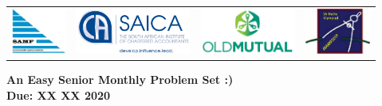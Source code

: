 \documentclass{article}
\begin{document}
\setlength{\tabcolsep}{5pt}
\begin{center} \begin{tabular}{cccc}
	\includegraphics[height=43pt]{SAMF_logo.jpg} &
	\includegraphics[height=43pt]{SAICA_logo.jpg} &
	\includegraphics[height=43pt]{OM_Logo_Stacked_Vignette_on_White_RGB.jpg} &
	\includegraphics[height=43pt]{SAMO2019.png}
\end{tabular} \end{center}


\bigskip


\begin{center}
\textbf{\Large An Easy Senior Monthly Problem Set :)}
\\ \bigskip
\textbf{\large Due: XX XX 2020}
\end{center}
\end{document}
